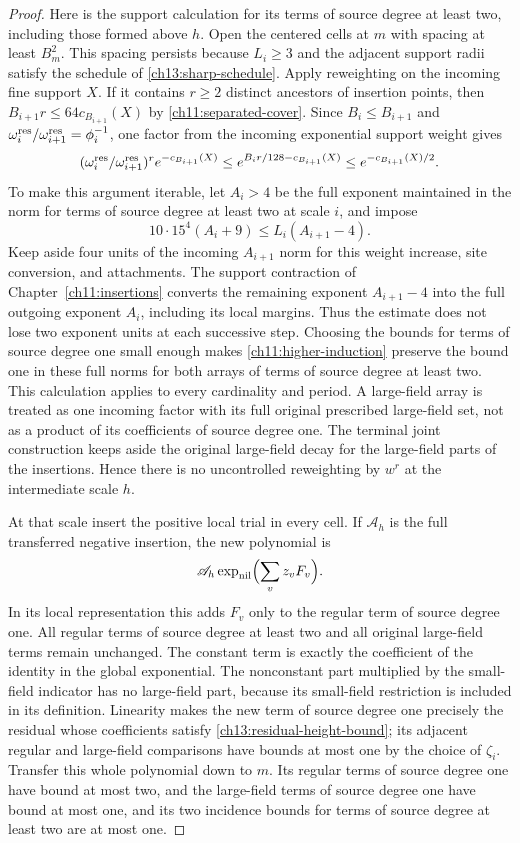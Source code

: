 \begin{proof}
Here is the support calculation for its terms of source degree at least two, including those
formed above $h$. Open the centered cells at $m$ with spacing at least
$B_m^2$. This spacing persists because $L_i\ge3$ and the adjacent
support radii satisfy the schedule of \eqref{ch13:sharp-schedule}.
Apply reweighting on the incoming fine support $X$. If it contains
$r\ge2$ distinct ancestors of insertion points, then
$B_{i+1}r\le64c_{B_{i+1}}(X)$ by \eqref{ch11:separated-cover}.
Since $B_i\le B_{i+1}$ and $\omega_i^{\rm res}/\omega_{i+1}^{\rm res}=\phi_i^{-1}$, one factor from the incoming exponential support weight gives
\[
 (\omega_i^{\rm res}/\omega_{i+1}^{\rm res})^r e^{-c_{B_{i+1}}(X)}
 \le e^{B_i r/128-c_{B_{i+1}}(X)}
 \le e^{-c_{B_{i+1}}(X)/2}.
\]
To make this argument iterable, let $A_i>4$ be the full exponent
maintained in the norm for terms of source degree at least two at scale $i$, and impose
\[
 10\cdot15^4(A_i+9)\le L_i(A_{i+1}-4).
\]
Keep aside four units of the incoming $A_{i+1}$ norm for this weight
increase, site conversion, and attachments. The support contraction
of Chapter~\ref{ch11:insertions} converts the remaining exponent
$A_{i+1}-4$ into the full outgoing exponent $A_i$, including its local
margins. Thus the estimate does not lose two exponent units at each
successive step. Choosing the bounds for terms of source degree one small enough makes
\eqref{ch11:higher-induction} preserve the bound one in these full norms
for both arrays of terms of source degree at least two. This calculation applies to every cardinality and
period. A large-field array is treated as one incoming factor with
its full original prescribed large-field set, not as a product of its coefficients of source degree one. The terminal joint construction keeps aside the original
large-field decay for the large-field parts of the insertions. Hence there is no
uncontrolled reweighting by $w^r$ at the intermediate scale $h$.

At that scale insert the positive local trial in every cell.
If $\mathscr A_h$ is the full transferred negative insertion, the new polynomial is
\[
 \mathscr A_h\exp_{\rm nil}\Bigl(\sum_v z_vF_v\Bigr).
\]
In its local representation this adds $F_v$ only to the regular
term of source degree one. All regular terms of source degree at least two and all original large-field
terms remain unchanged. The constant term is exactly the coefficient of the identity in the global exponential.
The nonconstant part multiplied by the small-field indicator has no large-field part, because
its small-field restriction is included in its definition.
Linearity makes the new term of source degree one precisely the residual whose
coefficients satisfy \eqref{ch13:residual-height-bound}; its adjacent
regular and large-field comparisons have bounds at most one by the
choice of $\zeta_i$. Transfer this whole polynomial down to $m$. Its regular terms of source degree one have bound at most two, and the
large-field terms of source degree one have bound at most one, and its two incidence bounds for terms of source degree at least two are at most one.


\end{proof}

